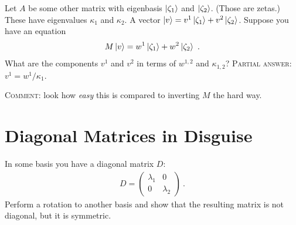\documentclass[12pt, oneside]{report}    %
\let\oldsection\section
\def\section{%
  \setcounter{sidenote}{1}%
  \oldsection
}
\begin{document}
\begin{exercise}
Let $A$ be some other matrix with eigenbasis $\left|\zeta_1\right\rangle$ and $\left|\zeta_2\right\rangle$. (Those are zetas.) These have eigenvalues $\kappa_1$ and $\kappa_2$. A vector $\left|v\right\rangle = v^1\left|\zeta_1\right\rangle + v^2 \left|\zeta_2\right\rangle$. Suppose you have an equation
\begin{align}
    M\left|v\right\rangle = w^1 \left|\zeta_1\right\rangle +  w^2\left|\zeta_2\right\rangle \ .
\end{align}
What are the components $v^1$ and $v^2$ in terms of $w^{1,2}$ and $\kappa_{1,2}$? \textsc{Partial answer:} $v^1 = w^1/\kappa_1$.

\textsc{Comment}: look how \emph{easy} this is compared to inverting $M$ the hard way. 
\end{exercise}



\section{Diagonal Matrices in Disguise}

\begin{exercise} In some basis you have a diagonal matrix $D$:
\begin{align}
D =
\begin{pmatrix}
    \lambda_1 & 0 \\
    0 & \lambda_2
\end{pmatrix}     \ .
\end{align}
Perform a rotation to another basis and show that the resulting matrix is not diagonal, but it is symmetric. 
\end{exercise}
\end{document}
